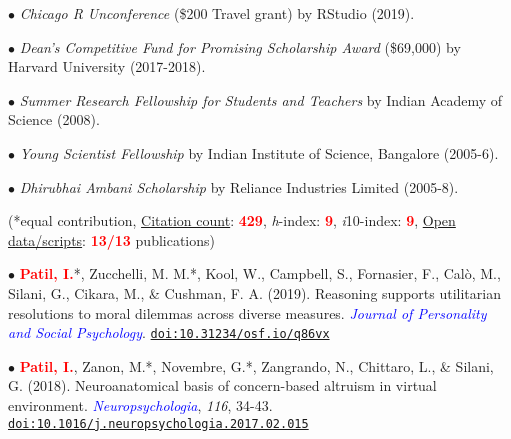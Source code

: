 \documentclass[10pt]{article}
\begin{document}
	
	
	
	$\bullet$ \textit{Chicago R Unconference} (\$200 Travel grant) by RStudio (2019).\\
	\miniskip		
	
	$\bullet$ \textit{Dean's Competitive Fund for Promising Scholarship Award} (\$69,000) by Harvard University (2017-2018).\\
	\miniskip	
	
	$\bullet$ {\it Summer Research Fellowship for Students and Teachers} by Indian Academy of Science (2008).\\
	\miniskip
	
	$\bullet$ {\it Young Scientist Fellowship} by Indian Institute of Science, Bangalore (2005-6).\\
	\miniskip
	
	$\bullet$ {\it Dhirubhai Ambani Scholarship} by Reliance Industries Limited (2005-8). 
	
	\begin{center}
	(*equal contribution, \href{https://scholar.google.it/citations?user=kSYuYTUAAAAJ&hl=en&oi=ao}{Citation count}: \textbf{\textcolor{red}{429}}, \textit{h}-index: \textbf{\textcolor{red}{9}}, \textit{i}10-index: \textbf{\textcolor{red}{9}}, \href{https://osf.io/hk5f3/}{Open data/scripts}: \textbf{\textcolor{red}{13/13}} publications)\\
	\end{center}

	$\bullet$ \textbf{\textcolor{red}{Patil, I.}}*, Zucchelli, M. M.*, Kool, W., Campbell, S., Fornasier, F., Cal\`{o}, M., Silani, G., Cikara, M., \& \hspace*{0.1in}Cushman, F. A. (2019). Reasoning supports utilitarian resolutions to moral dilemmas across diverse \hspace*{0.1in}measures. \textit{\textcolor{blue}{Journal of Personality and Social Psychology}}. \href{https://psyarxiv.com/q86vx/}{\tt doi:10.31234/osf.io/q86vx}
	\miniskip
	
	$\bullet$ \textbf{\textcolor{red}{Patil, I.}}, Zanon, M.*, Novembre, G.*, Zangrando, N., Chittaro, L., \& Silani, G. (2018). Neuroanatomical \hspace*{0.1in}basis of concern-based altruism in virtual environment. \textit{\textcolor{blue}{Neuropsychologia}}, \textit{116}, 34-43. \hspace*{0.1in}\href{https://drive.google.com/open?id=0B6_u70YpdJKnWU0zblpBOUMxRXc}{\tt doi:10.1016/j.neuropsychologia.2017.02.015}
	\miniskip	
	
\end{document}
